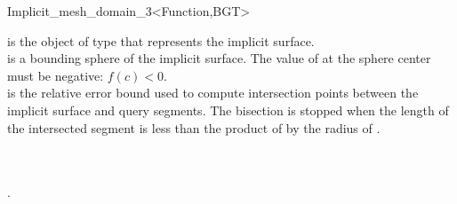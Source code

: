\begin{ccRefClass}{Implicit_mesh_domain_3<Function,BGT>}
\ccIsModel
{}




\ccCreation
{}

{ is the object of type  that represents the implicit
  surface.\\
  is a bounding sphere of the implicit surface. The
 value of  at the sphere center  must be
 negative: $f(c)<0$.\\
  is the relative error bound 
used to  compute intersection points between the implicit surface
and  query segments.  The
bisection is stopped when the length of the intersected
segment  is less than the  product of  by the
radius of .}




\ccSeeAlso

 \\
 \\
.



\end{ccRefClass}

\ccRefPageEnd


